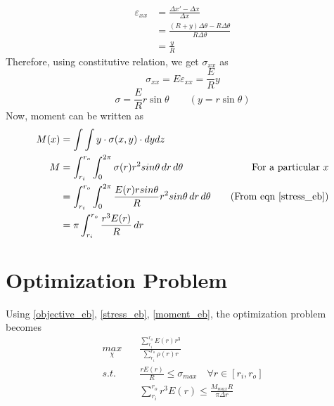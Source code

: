 \documentclass[openright,twoside]{iitkthesis}
\begin{document}
\begin{equation}
\begin{split}
\varepsilon_{xx} &= \frac{\Delta x' - \Delta x}{\Delta x}\\
&= \frac{(R+y)\Delta\theta - R\Delta\theta}{R\Delta\theta}\\
&= \frac{y}{R}
\end{split}
\end{equation}
Therefore, using constitutive relation, we get $\sigma_{xx}$ as
\begin{equation}
\sigma_{xx} = E\varepsilon_{xx} = \frac{E}{R}y
\end{equation}
\begin{equation}\label{stress_eb}
\sigma = \frac{E}{R}r\sin\theta \qquad (y = r\sin\theta)
\end{equation}
Now, moment can be written as
\begin{equation}\label{moment_eb}
\begin{split}
M(x) &= \int\int y\cdot\sigma(x,y)\cdot dydz\\
M &= \int_{r_i}^{r_o}\int_0^{2\pi}\sigma(r)r^2 sin\theta\,dr\,d\theta & \text{For a particular $x$}\\
&=\int_{r_i}^{r_o}\int_0^{2\pi} \frac{E(r)r sin\theta}{R}r^2 sin\theta\,dr\,d\theta &\quad (\text{From eqn }\eqref{stress_eb})\\
&=\pi\int_{r_i}^{r_o}\frac{r^3 E(r)}{R}\,dr
\end{split}
\end{equation}
\section{Optimization Problem}
Using \eqref{objective_eb}, \eqref{stress_eb}, \eqref{moment_eb}, the optimization problem becomes
\begin{equation}
\begin{split}
\underset{\chi}{max} \quad& \frac{\sum^{r_o}_{r_i}E(r)r^3}{\sum^{r_o}_{r_i}\rho(r)r}\\
s.t. \quad& \frac{rE(r)}{R}\leq \sigma_{max} \quad \forall r \in [r_i, r_o]\\
& \sum_{r_i}^{r_o}r^3E(r)\leq \frac{M_{max}R}{\pi\Delta r}
\end{split}
\end{equation}
\end{document}
